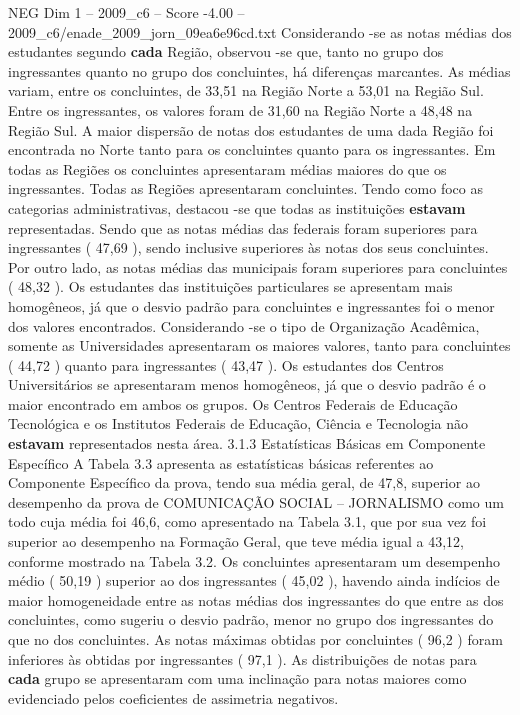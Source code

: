 \begin{textsample}{NEG Dim 1 – 2009\_c6 – Score -4.00 – 2009\_c6/enade\_2009\_jorn\_09ea6e96cd.txt}
Considerando -se as notas médias dos estudantes segundo \textbf{cada} Região, observou -se que, tanto no grupo dos ingressantes quanto no grupo dos concluintes, há diferenças marcantes.
As médias variam, entre os concluintes, de 33,51 na Região Norte a 53,01 na Região Sul.
Entre os ingressantes, os valores foram de 31,60 na Região Norte a 48,48 na Região Sul.
A maior dispersão de notas dos estudantes de uma dada Região foi encontrada no Norte tanto para os concluintes quanto para os ingressantes.
Em todas as Regiões os concluintes apresentaram médias maiores do que os ingressantes.
Todas as Regiões apresentaram concluintes.
Tendo como foco as categorias administrativas, destacou -se que todas as instituições \textbf{estavam} representadas.
Sendo que as notas médias das federais foram superiores para ingressantes ( 47,69 ), sendo inclusive superiores às notas dos seus concluintes.
Por outro lado, as notas médias das municipais foram superiores para concluintes ( 48,32 ).
Os estudantes das instituições particulares se apresentam mais homogêneos, já que o desvio padrão para concluintes e ingressantes foi o menor dos valores encontrados.
Considerando -se o tipo de Organização Acadêmica, somente as Universidades apresentaram os maiores valores, tanto para concluintes ( 44,72 ) quanto para ingressantes ( 43,47 ).
Os estudantes dos Centros Universitários se apresentaram menos homogêneos, já que o desvio padrão é o maior encontrado em ambos os grupos.
Os Centros Federais de Educação Tecnológica e os Institutos Federais de Educação, Ciência e Tecnologia não \textbf{estavam} representados nesta área. 3.1.3 Estatísticas Básicas em Componente Específico A Tabela 3.3 apresenta as estatísticas básicas referentes ao Componente Específico da prova, tendo sua média geral, de 47,8, superior ao desempenho da prova de COMUNICAÇÃO SOCIAL – JORNALISMO como um todo cuja média foi 46,6, como apresentado na Tabela 3.1, que por sua vez foi superior ao desempenho na Formação Geral, que teve média igual a 43,12, conforme mostrado na Tabela 3.2.
Os concluintes apresentaram um desempenho médio ( 50,19 ) superior ao dos ingressantes ( 45,02 ), havendo ainda indícios de maior homogeneidade entre as notas médias dos ingressantes do que entre as dos concluintes, como sugeriu o desvio padrão, menor no grupo dos ingressantes do que no dos concluintes.
As notas máximas obtidas por concluintes ( 96,2 ) foram inferiores às obtidas por ingressantes ( 97,1 ).
As distribuições de notas para \textbf{cada} grupo se apresentaram com uma inclinação para notas maiores como evidenciado pelos coeficientes de assimetria negativos.

\end{textsample}
